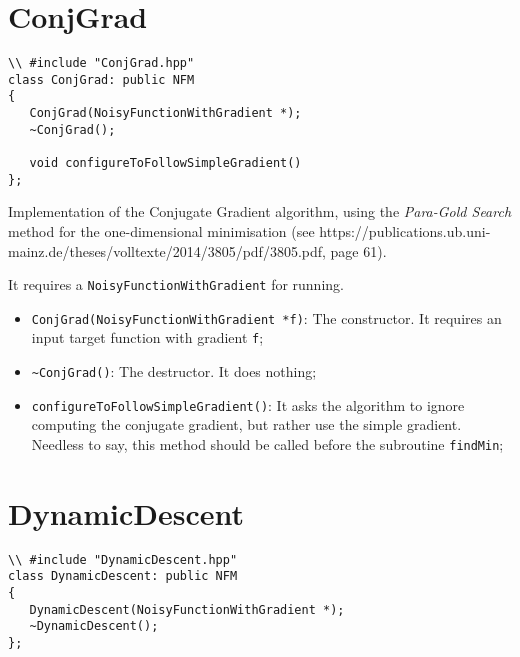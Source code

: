 \documentclass[11pt,a4paper,twoside]{article}
\begin{document}
\section{ConjGrad} %
\label{sec:conjgrad}

\begin{lstlisting}
\\ #include "ConjGrad.hpp"
class ConjGrad: public NFM
{
   ConjGrad(NoisyFunctionWithGradient *);
   ~ConjGrad();
   
   void configureToFollowSimpleGradient()
};
\end{lstlisting}

Implementation of the Conjugate Gradient algorithm, using the \emph{Para-Gold Search} method for the one-dimensional minimisation (see https://publications.ub.uni-mainz.de/theses/volltexte/2014/3805/pdf/3805.pdf, page 61).

It requires a \verb+NoisyFunctionWithGradient+ for running.

\begin{itemize}
   \item \verb+ConjGrad(NoisyFunctionWithGradient *f)+: The constructor. It requires an input target function with gradient \verb+f+;
   \item \verb+~ConjGrad()+: The destructor. It does nothing;
   \item \verb+configureToFollowSimpleGradient()+: It asks the algorithm to ignore computing the conjugate gradient, but rather use the simple gradient. Needless to say, this method should be called before the subroutine \verb+findMin+;
\end{itemize}





\section{DynamicDescent} %
\label{sec:dynamicdescent}

\begin{lstlisting}
\\ #include "DynamicDescent.hpp"
class DynamicDescent: public NFM
{
   DynamicDescent(NoisyFunctionWithGradient *);
   ~DynamicDescent();   
};
\end{lstlisting}
\end{document}
